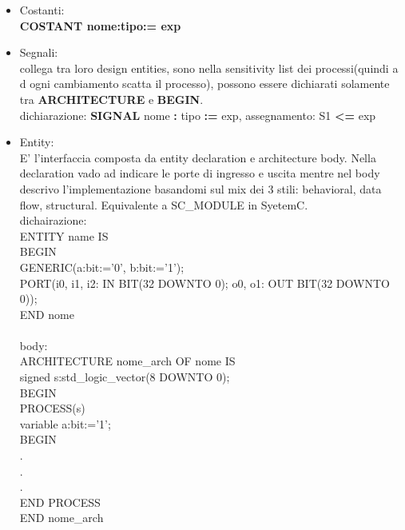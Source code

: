 \documentclass[10pt,a4paper,oneside]{scrbook}
\begin{document}
\begin{itemize}
    \item Costanti:\\
    \textbf{COSTANT nome:tipo:= exp}
    \item Segnali:\\
    collega tra loro design entities, sono nella sensitivity list dei processi(quindi a d ogni cambiamento scatta il processo), possono essere dichiarati solamente tra \textbf{ARCHITECTURE} e \textbf{BEGIN}.\\
    dichiarazione: \textbf{SIGNAL} nome \textbf{:} tipo \textbf{:=} exp, assegnamento: S1 \textbf{\textless=} exp
    \item Entity:\\
    E' l'interfaccia composta da entity declaration e architecture body. Nella declaration vado ad indicare le porte di ingresso e uscita mentre nel body descrivo l'implementazione basandomi sul mix dei 3 stili: behavioral, data flow, structural. Equivalente a SC\_MODULE in SyetemC.\\
    dichairazione:\\ %
    ENTITY name IS\\
    BEGIN\\
        GENERIC(a:bit:='0', b:bit:='1');\\
        PORT(i0, i1, i2: IN BIT(32 DOWNTO 0); o0, o1: OUT BIT(32 DOWNTO 0));\\
    END nome\\
    \\
    body:\\
    ARCHITECTURE nome\_arch OF nome IS\\
        signed s:std\_logic\_vector(8 DOWNTO 0);\\
    BEGIN\\
        PROCESS(s)\\
            variable a:bit:='1';\\
        BEGIN\\
            .\\
            .\\
            .\\
        END PROCESS\\
    END nome\_arch
\end{itemize}
\end{document}
